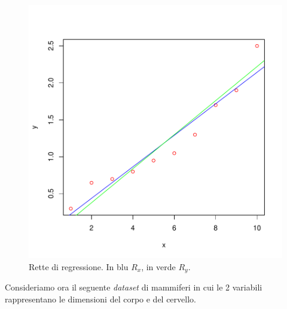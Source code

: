 \documentclass[onecolumn,12pt]{book}
\begin{document}
\begin{figure}[htbp]
\begin{center}
\includegraphics{RbookParte2-049}
\caption{Rette di regressione. In blu $R_x$, in verde $R_y$.}
\label{fig:duerettex}
\end{center}
\end{figure}
Consideriamo ora il seguente \emph{dataset} di mammiferi  in cui le 2 variabili rappresentano  le dimensioni del corpo e del cervello.
\end{document}
